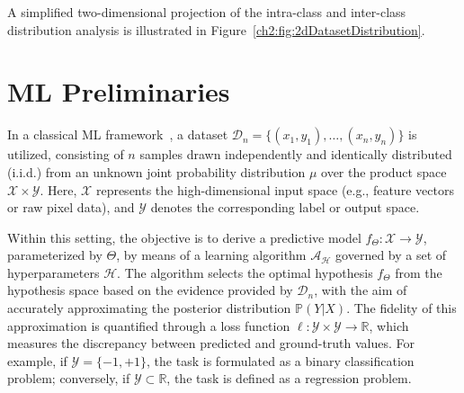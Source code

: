 A simplified two-dimensional projection of the intra-class and inter-class distribution analysis is illustrated in Figure~\ref{ch2:fig:2dDatasetDistribution}.

\section{ML Preliminaries}
\label{ch2:sec:prel}
In a classical ML framework~\citep{shalev2014understanding,goodfellow2016deep,aggarwal2023neural}, a dataset $\mathcal{D}_n = \{ (x_1, y_1), \dots, (x_n, y_n) \}$ is utilized, consisting of $n$ samples drawn independently and identically distributed (i.i.d.) from an unknown joint probability distribution $\mu$ over the product space $\mathcal{X} \times \mathcal{Y}$. 
Here, $\mathcal{X}$ represents the high-dimensional input space (e.g., feature vectors or raw pixel data), and $\mathcal{Y}$ denotes the corresponding label or output space.

Within this setting, the objective is to derive a predictive model $f_\Theta: \mathcal{X} \rightarrow \mathcal{Y}$, parameterized by $\Theta$, by means of a learning algorithm $\mathscr{A}_\mathcal{H}$ governed by a set of hyperparameters $\mathcal{H}$. The algorithm selects the optimal hypothesis $f_\Theta$ from the hypothesis space based on the evidence provided by $\mathcal{D}_n$, with the aim of accurately approximating the posterior distribution $\mathbb{P}(Y|X)$.
The fidelity of this approximation is quantified through a loss function $\ell: \mathcal{Y} \times \mathcal{Y} \rightarrow \mathbb{R}$, which measures the discrepancy between predicted and ground-truth values. For example, if $\mathcal{Y} = \{-1, +1\}$, the task is formulated as a binary classification problem; conversely, if $\mathcal{Y} \subset \mathbb{R}$, the task is defined as a regression problem.

